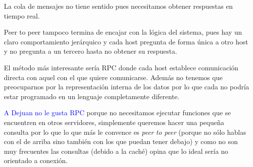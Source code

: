 \begin{problem}[12]
\spart

La cola de mensajes no tiene sentido pues necesitamos obtener respuestas en tiempo real.

Peer to peer tampoco termina de encajar con la lógica del sistema, pues hay un claro comportamiento jerárquico y cada host pregunta de forma única a otro host y no pregunta a un tercero hasta no obtener su respuesta.

El método más interesante sería RPC donde cada host establece comunicación directa con aquel con el que quiere comunicarse. Además no tenemos que preocuparnos por la representación interna de los datos por lo que cada no podría estar programado en un lenguaje completamente diferente.

\textcolor{blue}{A Dejuan no le gusta RPC} porque no necesitamos ejecutar funciones que se encuentren en otros servidores, simplemente queremos hacer una pequeña consulta por lo que lo que más le convence es \textit{peer to peer} (porque no sólo hablas con el de arriba sino también con los que puedan tener debajo) y como no son muy frecuentes las consultas (debido a la caché) opina que lo ideal sería no orientado a conexión. 

\end{problem}


